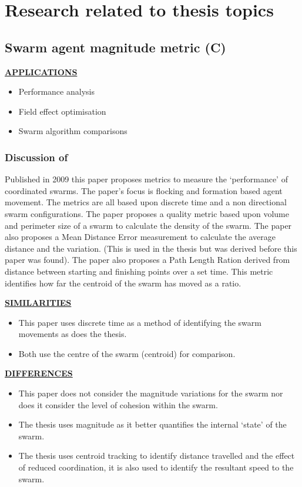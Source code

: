 \documentclass[a4paper,11pt,nocenter,bold,notitlepage,noheadline,noindent]{
thesis}
\begin{document}
\mainmatter
\linespread{1.3}
\setcounter{chapter}{0}
\chapter{Research related to thesis topics}

\section{Swarm agent magnitude metric (C) \cite{NIM:09,HS:05,RMT:15}}
\textbf{\underline{APPLICATIONS}}
\begin{itemize}  
\setlength\itemsep{0em}
  \item Performance analysis \cite{NIM:09,HS:05}
  \item Field effect optimisation
  \item Swarm algorithm comparisons
\end{itemize}

\subsection{Discussion of \cite{NIM:09}} 
Published in 2009 this paper proposes metrics to measure the `performance' of coordinated swarms. The paper's focus is flocking and formation based agent movement. The metrics are all based upon discrete time and a non directional swarm configurations. The paper proposes a quality metric based upon volume and perimeter size of a swarm to calculate the density of the swarm. The paper also proposes a Mean Distance Error measurement to calculate the average distance and the variation. (This is used in the thesis but was derived before this paper was found). The paper also proposes a Path Length Ration derived from distance between starting and finishing points over a set time. This metric identifies how far the centroid of the swarm has moved as a ratio.
  
\textbf{\underline{SIMILARITIES}}
\begin{itemize}
   \setlength\itemsep{0em}
	\item This paper uses discrete time as a method of identifying the swarm movements as does the thesis.
	\item Both use the centre of the swarm (centroid) for comparison.
\end{itemize} 

\textbf{\underline{DIFFERENCES}}
\begin{itemize}
   \setlength\itemsep{0em}
	\item This paper does not consider the magnitude variations for the swarm nor does it consider the level of cohesion within the swarm. 
	\item The thesis uses magnitude as it better quantifies the internal `state' of the swarm. 
	\item The thesis uses centroid tracking to identify distance travelled and the effect of reduced coordination, it is also used to identify the resultant speed to the swarm.   
\end{itemize} 
\end{document}
